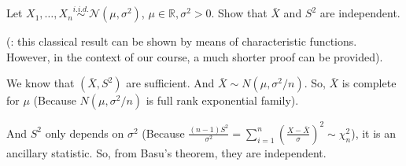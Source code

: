 \documentclass[12pt]{article}
\begin{document}
    \begin{exercise}
        Let \(X_{1}, \ldots, X_{n} \stackrel{i.i.d. }{\sim} \mathcal{N}\left(\mu, \sigma^{2}\right)\), \(\mu \in \mathbb{R}, \sigma^{2}>0 .\) Show that \(\bar{X}\) and \(S^{2}\) are independent. 
        
        (: this classical result can be shown by means of characteristic functions. However, in the context of our course, a much shorter proof can be provided). 
    \end{exercise}
    
    \begin{solution}
        We know that $(\bar{X}, S^2)$ are sufficient. And $\bar{X}\sim N(\mu,\sigma^2/n)$. So, $\bar{X}$ is complete for $\mu$ (Because $N(\mu,\sigma^2/n)$ is full rank exponential family). 
        
        And $S^2$ only depends on $\sigma^2$ (Because $\frac{(n-1)S^2}{\sigma^2}=\sum_{i=1}^n(\frac{X-\bar{X}}{\sigma})^2\sim\chi_n^2$), it is an ancillary statistic. So, from Basu's theorem, they are independent. 
    \end{solution}
\end{document}
